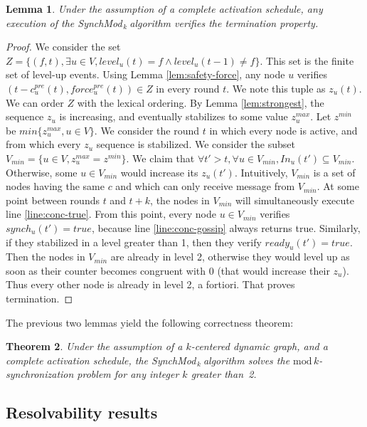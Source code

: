 \documentclass[11pt,letterpaper]{article}
\newtheorem{thm}{Theorem}
\newtheorem{lem}[thm]{Lemma}
\newcommand{\SM}{{\em SynchMod}$_{\,k}\ $}
\begin{document}
\begin{lem}
	Under the assumption of a complete activation schedule,
	any execution of the \SM algorithm verifies the termination property.
\end{lem}
\begin{proof}
	We consider the set $Z = \{(f,t), \exists u \in V, level_u(t) = f \wedge level_u(t-1) \neq f\}$.
	This set is the finite set of level-up events.
	Using Lemma \ref{lem:safety-force}, any node $u$ verifies $(t-c_u^{pre}(t), force_u^{pre}(t)) \in Z$ in every round $t$.
	We note this tuple as $z_u(t)$.
	We can order $Z$ with the lexical ordering.
	By Lemma \ref{lem:strongest}, the sequence $z_u$ is increasing, and eventually stabilizes to some value $z_u^{max}$.
	Let $z^{min}$ be $min \{z_u^{max}, u \in V\}$.
	We consider the round $t$ in which every node is active, and from which every $z_u$ sequence is stabilized.
	We consider the subset $V_{min} = \{u \in V, z_u^{max} = z^{min}\}$.
	We claim that $\forall t' > t, \forall u \in V_{min}, In_u(t') \subseteq V_{min}$.
	Otherwise, some $u \in V_{min}$ would increase its $z_u(t')$.
	Intuitively, $V_{min}$ is a set of nodes having the same $c$ and which can only receive message from $V_{min}$.
	At some point between rounds $t$ and $t+k$, the nodes in $V_{min}$ will simultaneously execute line \ref{line:conc-true}.
	From this point, every node $u \in V_{min}$ verifies $synch_u(t') = true$, because line \ref{line:conc-gossip} always returns true.
	Similarly, if they stabilized in a level greater than 1, then they verify $ready_u(t') = true$.
	Then the nodes in $V_{min}$ are already in level 2, otherwise they would level up as soon as their counter becomes congruent with 0 (that would increase their $z_u$).
	Thus every other node is already in level 2, a fortiori.
	That proves termination.
\end{proof}

The previous two lemmas yield the following correctness theorem:

\begin{thm} \label{lem:safety} 
	Under the assumption of a $k$-centered dynamic graph, and a complete activation schedule,
	the \SM algorithm solves the $\mathrm{mod}\,k$-synchronization problem for any integer $k$ greater than~2.
\end{thm}

\subsection{Resolvability results}
\end{document}

